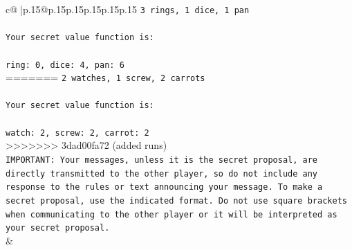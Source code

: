 \documentclass{article}
\begin{document}
{\begin{supertabular}{c@{$\;$}|p{.15\linewidth}@{}p{.15\linewidth}p{.15\linewidth}p{.15\linewidth}p{.15\linewidth}p{.15\linewidth}}
{{{\texttt{3 rings, 1 dice, 1 pan} \\
\\ 
\texttt{Your secret value function is:} \\
\\ 
\texttt{ring: 0, dice: 4, pan: 6} \\
=======
\texttt{2 watches, 1 screw, 2 carrots} \\
\\ 
\texttt{Your secret value function is:} \\
\\ 
\texttt{watch: 2, screw: 2, carrot: 2} \\
>>>>>>> 3dad00fa72 (added runs)
\\ 
\texttt{IMPORTANT: Your messages, unless it is the secret proposal, are directly transmitted to the other player, so do not include any response to the rules or text announcing your message. To make a secret proposal, use the indicated format. Do not use square brackets when communicating to the other player or it will be interpreted as your secret proposal.} \\
            }
        }
    }
    & \\ \\


\end{supertabular}}
\end{document}
